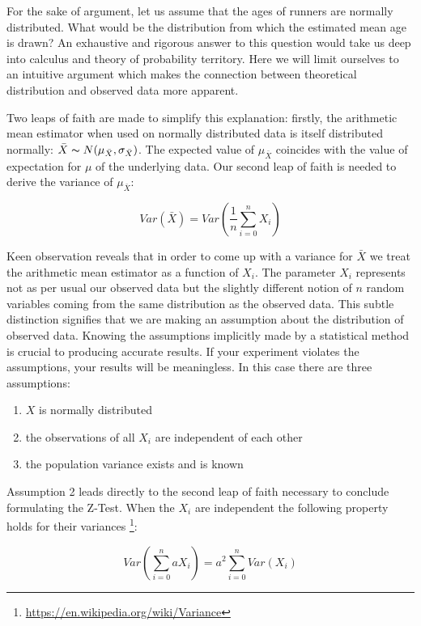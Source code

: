 \documentclass{tufte-book} %
\begin{document}
For the sake of argument, let us assume that the ages of runners are normally distributed. What would be the distribution from which the estimated mean age is drawn? An exhaustive and rigorous answer to this question would take us deep into calculus and theory of probability territory. Here we will limit ourselves to an intuitive argument which makes the connection between theoretical distribution and observed data more apparent.

Two leaps of faith are made to simplify this explanation: firstly, the arithmetic mean estimator when used on normally distributed data is itself distributed normally: $\bar{X} \thicksim N(\mu_{\bar{X}}, \sigma_{\bar{X}})$. The expected value of $\mu_{\bar{X}}$ coincides with the value of expectation for $\mu$ of the underlying data. Our second leap of faith is needed to derive the variance of $\mu_{\bar{X}}$:

\begin{equation}
Var(\bar{X}) = Var(\frac{1}{n}\sum_{i=0}^n X_i)
\label{formula:mean-variance}
\end{equation}

Keen observation reveals that in order to come up with a variance for $\bar{X}$ we treat the arithmetic mean estimator as a function of $X_i$. The parameter $X_i$ represents not as per usual our observed data but the slightly different notion of $n$ random variables coming from the same distribution as the observed data. This subtle distinction signifies that we are making an assumption about the distribution of observed data. Knowing the assumptions implicitly made by a statistical method is crucial to producing accurate results. If your experiment violates the assumptions, your results will be meaningless. In this case there are three assumptions:

\begin{enumerate}
	\item $X$ is normally distributed
	\item the observations of all $X_i$ are independent of each other
	\item the population variance exists and is known
\end{enumerate}

Assumption 2 leads directly to the second leap of faith necessary to conclude formulating the \hbox{Z-Test}. When the $X_i$ are independent the following property holds for their variances  \footnote{\url{https://en.wikipedia.org/wiki/Variance}}:

\begin{equation}
Var(\sum_{i=0}^n a X_i) = a^2 \sum_{i = 0}^n Var(X_i)
\label{formula:variance-property}
\end{equation}
\end{document}
